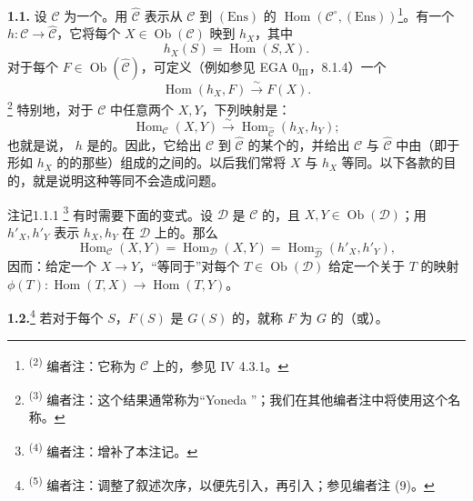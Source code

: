 \textbf{1.1.} 设 $\mathcal C$ 为一个。用 $\widehat{\mathcal C}$ 表示从 $\mathcal C$ 到 $(\mathrm{Ens})$ 的 $\operatorname{Hom}(\mathcal C^\circ,(\mathrm{Ens}))$\footnote{\textsuperscript{(2)} 编者注：它称为 $\mathcal C$ 上的，参见 IV 4.3.1。}。有一个 $h:\mathcal C\to\widehat{\mathcal C}$，它将每个 $X\in\operatorname{Ob}(\mathcal C)$ 映到 $h_X$，其中
\[
h_X(S)=\operatorname{Hom}(S,X).
\]
对于每个 $F\in\operatorname{Ob}(\widehat{\mathcal C})$，可定义（例如参见 EGA $0_{\mathrm{III}}$，8.1.4）一个
\[
\operatorname{Hom}(h_X,F)\xrightarrow{\sim}F(X).
\]
\footnote{\textsuperscript{(3)} 编者注：这个结果通常称为“Yoneda ”；我们在其他编者注中将使用这个名称。}
特别地，对于 $\mathcal C$ 中任意两个 $X,Y$，下列映射是：
\[
\operatorname{Hom}_{\mathcal C}(X,Y)\xrightarrow{\sim}
\operatorname{Hom}_{\widehat{\mathcal C}}(h_X,h_Y);
\]
也就是说， $h$ 是的。因此，它给出 $\mathcal C$ 到 $\widehat{\mathcal C}$ 的某个的，并给出 $\mathcal C$ 与 $\widehat{\mathcal C}$ 中由（即于形如 $h_X$ 的的那些）组成的之间的。以后我们常将 $X$ 与 $h_X$ 等同。以下各款的目的，就是说明这种等同不会造成问题。

\begin{SGAresult}{注记}{1.1.1}
\footnote{\textsuperscript{(4)} 编者注：增补了本注记。}
有时需要下面的变式。设 $\mathcal D$ 是 $\mathcal C$ 的，且 $X,Y\in\operatorname{Ob}(\mathcal D)$；用 $h'_X,h'_Y$ 表示 $h_X,h_Y$ 在 $\mathcal D$ 上的。那么
\[
\operatorname{Hom}_{\mathcal C}(X,Y)=\operatorname{Hom}_{\mathcal D}(X,Y)
=\operatorname{Hom}_{\widehat{\mathcal D}}(h'_X,h'_Y),
\]
因而：给定一个 $X\to Y$，“等同于”对每个 $T\in\operatorname{Ob}(\mathcal D)$ 给定一个关于 $T$ 的映射 $\phi(T):\operatorname{Hom}(T,X)\to\operatorname{Hom}(T,Y)$。
\end{SGAresult}

\textbf{1.2.}\footnote{\textsuperscript{(5)} 编者注：调整了叙述次序，以便先引入，再引入；参见编者注 (9)。}
若对于每个 $S$，$F(S)$ 是 $G(S)$ 的，就称 $F$ 为 $G$ 的（或）。

